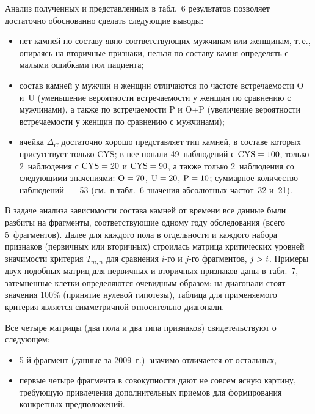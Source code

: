 \begin{multicols}{2}
      Анализ полученных и представленных в табл.~6 результатов позволяет достаточно 
обоснованно сделать следующие выводы:
      \begin{itemize}
\item нет камней по составу явно соответствующих мужчинам или женщинам, т.\,е., 
опираясь на вторичные признаки, нельзя по составу камня определять с малыми 
ошибками пол пациента;
\item состав камней у мужчин и женщин отличаются по частоте встречаемости O и~U 
(уменьшение вероятности встречаемости у женщин по сравнению с мужчинами), а также 
по встречаемости P и O\;+\;P (увеличение вероятности встре\-ча\-емости у женщин по 
сравнению с мужчинами); 
\item ячейка $\Delta_C$ достаточно хорошо представляет тип камней, в составе которых 
присутствует только CYS; в нее попали 49~наблюдений с $\mathrm{CYS}\hm=100$, 
только 2~наблюдения с $\mathrm{CYS}\hm=20$ и $\mathrm{CYS}\hm=90$, а также 
только 2~наблюдения со следующими значениями: $\mathrm{O}\hm=70$, 
$\mathrm{U}\hm=20$, $\mathrm{P}\hm=10$; суммарное количество наблюдений~--- 53 
(см.\ в табл.~6 значения абсолютных час\-тот~32 и~21).
      \end{itemize}
      

      
      В задаче анализа зависимости состава камней от времени все данные были разбиты на 
фрагменты, соответствующие одному году обследования (всего 5~фрагментов). Далее для 
каждого пола в отдельности и каждого набора признаков (первичных или вторичных) 
строилась матрица критических уровней значимости критерия $T_{m,n}$ для сравнения 
      $i$-го и $j$-го фрагментов, $j\hm>i$. Примеры двух подобных матриц для первичных 
и вторичных признаков даны в табл.~7, затемненные клетки определяются очевидным 
образом: на диагонали стоят значения 100\% (принятие нулевой гипотезы), таблица для 
применяемого критерия является симметричной относительно диагонали.
      

      
      Все четыре матрицы (два пола и два типа признаков) свидетельствуют о следующем:
      \begin{itemize}
\item 5-й фрагмент (данные за 2009~г.)\ значимо отличается от остальных, 
\item первые четыре фрагмента в совокупности дают не совсем ясную картину, 
требующую привлечения дополнительных приемов для формирования конкретных 
предположений.
\end{itemize}


\end{multicols}
